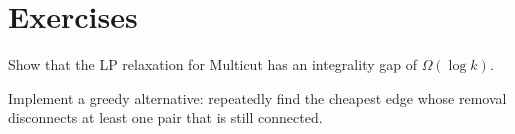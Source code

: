 \section{Exercises}
\begin{exercise}
Show that the LP relaxation for Multicut has an integrality gap of $\Omega(\log k)$.
\end{exercise}
\begin{exercise}
Implement a greedy alternative: repeatedly find the cheapest edge whose removal disconnects at least one pair that is still connected.
\end{exercise}

